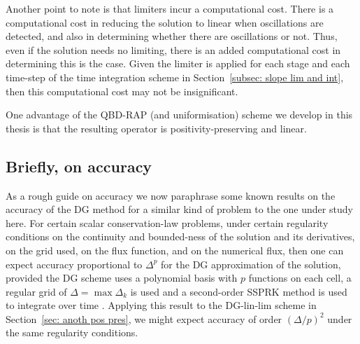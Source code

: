 Another point to note is that limiters incur a computational cost. There is a computational cost in reducing the solution to linear when oscillations are detected, and also in determining whether there are oscillations or not. Thus, even if the solution needs no limiting, there is an added computational cost in determining this is the case. Given the limiter is applied for each stage and each time-step of the time integration scheme in Section~\ref{subsec: slope lim and int}, then this computational cost may not be insignificant. 

One advantage of the QBD-RAP (and uniformisation) scheme we develop in this thesis is that the resulting operator is positivity-preserving and linear.
% 
% 

\subsection{Briefly, on accuracy}
As a rough guide on accuracy we now paraphrase some known results on the accuracy of the DG method for a similar kind of problem to the one under study here. For certain scalar conservation-law problems, under certain regularity conditions on the continuity and bounded-ness of the solution and its derivatives, on the grid used, on the flux function, and on the numerical flux, then one can expect accuracy proportional to \(\Delta^{p}\) for the DG approximation of the solution, provided the DG scheme uses a polynomial basis with \(p\) functions on each cell, a regular grid of \(\Delta = \max \Delta_k\) is used and a second-order SSPRK method is used to integrate over time \citep[Sections~5.5,~5.8, and references therein]{nodalDGBook}. Applying this result to the DG-lin-lim scheme in Section~\ref{sec: anoth pos pres}, we might expect accuracy of order \((\Delta/p)^2\) under the same regularity conditions.


